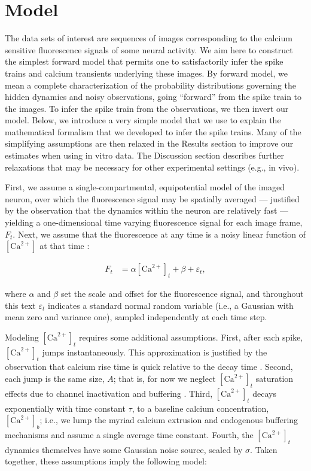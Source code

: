 \documentclass[12pt]{article}
\newcommand{\Ca}{[\text{Ca}^{2+}]}
\begin{document}
\section*{Model} \label{sec:model}

The data sets of interest are sequences of images corresponding to the calcium sensitive fluorescence signals of some neural activity. We aim here to construct the simplest forward model that permits one to satisfactorily infer the spike trains and calcium transients underlying these images. By forward model, we mean a complete characterization of the probability distributions governing the hidden dynamics and noisy observations, going ``forward'' from the spike train to the images. To infer the spike train from the observations, we then invert our model. Below, we introduce a very simple model that we use to explain the mathematical formalism that we developed to infer the spike trains. Many of the simplifying assumptions are then relaxed in the Results section to improve our estimates when using in vitro data.  The Discussion section describes further relaxations that may be necessary for other experimental settings (e.g., in vivo).  

First, we assume a single-compartmental, equipotential model of the imaged neuron, over which the fluorescence signal may be spatially averaged --- justified by the observation that the dynamics within the neuron are relatively fast \cite{TankDelaney95,SabatiniRegehr98, MajewskaYuste00} --- yielding a one-dimensional time varying fluorescence signal for each image frame, $F_t$.  Next, we assume that the fluorescence at any time is a noisy linear function of $\Ca$ at that time \cite{YasudaSvoboda04}:

\begin{align} \label{eq:F_t}
F_t &= \alpha \Ca_t + \beta + \varepsilon_t,
\end{align}

\noindent where $\alpha$ and $\beta$ set the scale and offset for the fluorescence signal, and throughout this text $\varepsilon_t$ indicates a standard normal random variable (i.e., a Gaussian with mean zero and variance one), sampled independently at each time step. 

Modeling $\Ca_t$ requires some additional assumptions. First, after each spike, $\Ca_t$ jumps instantaneously. This approximation is justified by the observation that calcium rise time is quick relative to the decay time \cite{YasudaSvoboda04, CornelisseMansvelder07}. Second, each jump is the same size, $A$; that is, for now we neglect $\Ca_t$ saturation effects due to channel inactivation and buffering \cite{RegehrAtluri95}. Third, $\Ca_t$ decays exponentially with time constant $\tau$, to a baseline calcium concentration, $\Ca_b$; i.e., we lump the myriad calcium extrusion and endogenous buffering mechanisms and assume a single average time constant. Fourth, the $\Ca_t$ dynamics themselves have some Gaussian noise source, scaled by $\sigma$. Taken together, these assumptions imply the following model:
\end{document}
